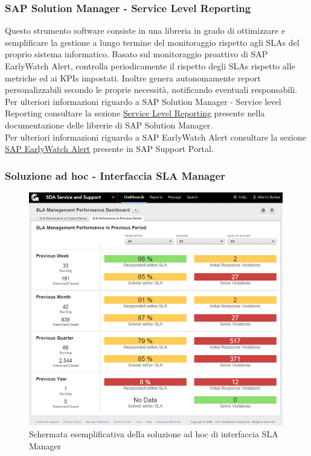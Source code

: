\subsubsection{SAP Solution Manager - Service Level Reporting}

Questo strumento software consiste in una libreria in grado di ottimizzare e semplificare la gestione a lungo termine del monitoraggio rispetto agli SLAs del proprio sistema informatico. Basato sul monitoraggio proattivo di  SAP EarlyWatch Alert, controlla periodicamente il rispetto degli SLAs rispetto alle metriche ed ai KPIs impostati. Inoltre genera autonomamente report personalizzabili secondo le proprie necessità, notificando eventuali responsabili.
Per ulteriori informazioni riguardo a SAP Solution Manager - Service level Reporting consultare la sezione \href{https://help.sap.com/doc/saphelp_sm71_sp08/7.1.08/en-US/36/5ec6267ba34de08c55e3c310ebdece/content.htm?no_cache=true}{Service Level Reporting} presente nella documentazione delle librerie di SAP Solution Manager.
\\
Per ulteriori informazioni riguardo a SAP EarlyWatch Alert consultare la sezione \href{https://support.sap.com/en/offerings-programs/support-services/earlywatch-alert.html}{SAP EarlyWatch Alert} presente in SAP Support Portal.

\subsubsection{Soluzione ad hoc - Interfaccia SLA Manager}

\begin{figure}[H]
\centering
\includegraphics[width=30em]{immagini/sla/slainterface.png}
\caption{Schermata esemplificativa della soluzione ad hoc di interfaccia SLA Manager}
\end{figure}

